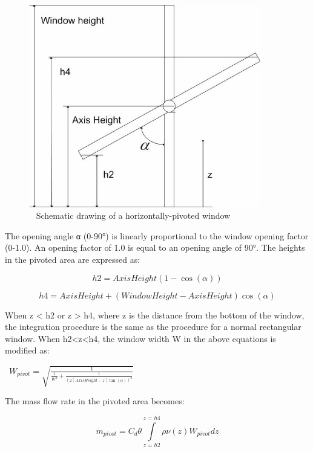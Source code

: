 \begin{figure}[hbtp] %
\centering
\includegraphics[width=0.9\textwidth, height=0.9\textheight, keepaspectratio=true]{media/image2703.png}
\caption{  Schematic drawing of a horizontally-pivoted window \protect \label{fig:schematic-drawing-of-a-horizontally-pivoted}}
\end{figure}

The opening angle α (0-90°) is linearly proportional to the window opening factor (0-1.0). An opening factor of 1.0 is equal to an opening angle of 90°. The heights in the pivoted area are expressed as:

\begin{equation}
h2 = AxisHeight(1 - \cos (\alpha ))
\end{equation}

\begin{equation}
h4 = AxisHeight + (WindowHeight - AxisHeight)\cos (\alpha )
\end{equation}

When z \textless{} h2 or z \textgreater{} h4, where z is the distance from the bottom of the window, the integration procedure is the same as the procedure for a normal rectangular window. When h2\textless{}z\textless{}h4, the window width W in the above equations is modified as:

~\({W_{pivot}} = \sqrt {\frac{1}{{\frac{1}{{{W^2}}} + \frac{1}{{{{(2(AxisHeight - z)\tan (\alpha ))}^2}}}}}}\)

The mass flow rate in the pivoted area becomes:

\begin{equation}
{\dot m_{pivot}} = {C_d}\theta \int\limits_{z = h2}^{z = h4} {\rho \nu (z){W_{pivot}}dz}
\end{equation}

